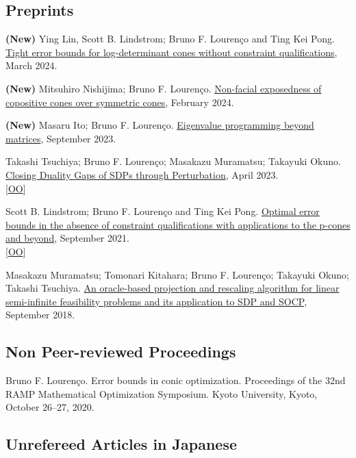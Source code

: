 \hypertarget{preprints}{%
\subsection{Preprints}\label{preprints}}

\textbf{(New)} Ying Lin, Scott B. Lindstrom; Bruno F. Lourenço and Ting
Kei Pong. \href{https://arxiv.org/abs/2403.07295}{Tight error bounds for
log-determinant cones without constraint qualifications}, March 2024.

\textbf{(New)} Mitsuhiro Nishijima; Bruno F. Lourenço.
\href{https://arxiv.org/abs/2402.12964}{Non-facial exposedness of
copositive cones over symmetric cones}, February 2024.

\textbf{(New)} Masaru Ito; Bruno F. Lourenço.
\href{https://optimization-online.org/?p=24315}{Eigenvalue programming
beyond matrices}, September 2023.

Takashi Tsuchiya; Bruno F. Lourenço; Masakazu Muramatsu; Takayuki Okuno.
\href{https://arxiv.org/abs/2304.04433}{Closing Duality Gaps of SDPs
through Perturbation}, April 2023.\\
{[}\href{https://optimization-online.org/?p=22584}{OO}{]}

Scott B. Lindstrom; Bruno F. Lourenço and Ting Kei Pong.
\href{https://arxiv.org/abs/2109.11729}{Optimal error bounds in the
absence of constraint qualifications with applications to the p-cones
and beyond}, September 2021.\\
{[}\href{http://www.optimization-online.org/DB_HTML/2021/09/8599.html}{OO}{]}

Masakazu Muramatsu; Tomonari Kitahara; Bruno F. Lourenço; Takayuki
Okuno; Takashi Tsuchiya.
\href{http://www.optimization-online.org/DB_HTML/2018/09/6833.html}{An
oracle-based projection and rescaling algorithm for linear semi-infinite
feasibility problems and its application to SDP and SOCP}, September
2018.

\hypertarget{non-peer-reviewed-proceedings}{%
\subsection{Non Peer-reviewed
Proceedings}\label{non-peer-reviewed-proceedings}}

Bruno F. Lourenço. Error bounds in conic optimization. Proceedings of
the 32nd RAMP Mathematical Optimization Symposium. Kyoto University,
Kyoto, October 26--27, 2020.

\hypertarget{unrefereed-articles-in-japanese}{%
\subsection{Unrefereed Articles in
Japanese}\label{unrefereed-articles-in-japanese}}

